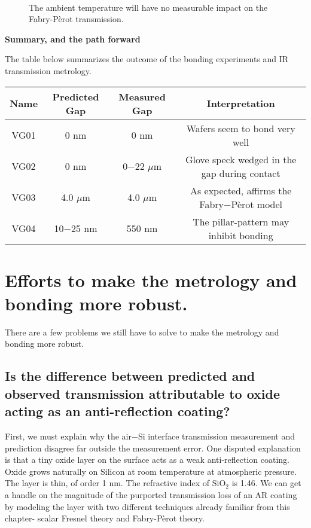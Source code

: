 \begin{figure}[h!] 
\begin{center}
\ 
\caption[Si temperature has negligible effect on Fabry-P\`{e}rot]{The ambient temperature will have no measurable impact on the Fabry-P\`{e}rot transmission.}
\label{fig:SiTempFP}
\end{center}
\end{figure}

\textbf{Summary, and the path forward}

The table below summarizes the outcome of the bonding experiments and IR transmission metrology.  

\begin{center}
    \begin{tabular}{ c c c c}
    \hline
    Name & Predicted Gap & Measured Gap & Interpretation \\ 
        \hline
    VG01 & 0 nm & 0 nm & Wafers seem to bond very well \\
    VG02 & 0 nm & 0$-$22 $\mu$m & Glove speck wedged in the gap during contact\\
    VG03 & 4.0 $\mu$m & 4.0 $\mu$m  & As expected, affirms the Fabry$-$P\`erot model \\    
    VG04 & 10$-$25 nm & 550 nm &  The pillar-pattern may inhibit bonding \\        
    \hline
    \end{tabular}
\end{center}

\section{Efforts to make the metrology and bonding more robust.}

There are a few problems we still have to solve to make the metrology and bonding more robust.

\subsection{Is the difference between predicted and observed transmission attributable to oxide acting as an anti-reflection coating?}
First, we must explain why the air$-$Si interface transmission measurement and prediction disagree far outside the measurement error.  One disputed explanation is that a tiny oxide layer on the surface acts as a weak anti-reflection coating.  Oxide grows naturally on Silicon at room temperature at atmospheric pressure.  The layer is thin, of order 1 nm.  The refractive index of SiO$_2$ is 1.46.  We can get a handle on the magnitude of the purported transmission loss of an AR coating by modeling the layer with two different techniques already familiar from this chapter- scalar Fresnel theory and Fabry-P\`erot theory.


